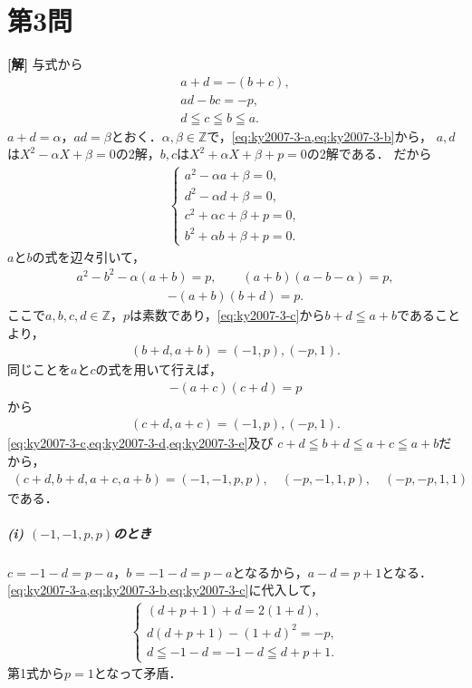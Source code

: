 \documentclass[../main.tex]{subfiles}
\begin{document}
\section*{第3問}

{\bf [解]}
与式から
\begin{align}
  a+d=-(b+c),\label{eq:ky2007-3-a}\\
  ad-bc=-p,\label{eq:ky2007-3-b}\\
  d\leqq c\leqq b\leqq a.\label{eq:ky2007-3-c}
\end{align}
$a+d=\alpha$，$ad=\beta$とおく．$\alpha,\beta\in\mathbb{Z}$で，\cref{eq:ky2007-3-a,eq:ky2007-3-b}から，
$a,d$は$X^2-\alpha X+\beta=0$の2解，$b,c$は$X^2+\alpha X+\beta+p=0$の2解である．
だから
\begin{align}
  \begin{cases}
    a^2-\alpha a+\beta=0,\\
    d^2-\alpha d+\beta=0,\\
    c^2+\alpha c+\beta+p=0,\\
    b^2+\alpha b+\beta+p=0.
  \end{cases}\label{eq:ky2007-3-roots}
\end{align}
$a$と$b$の式を辺々引いて，
\begin{align}
  a^2-b^2-\alpha(a+b)=p,\qquad(a+b)(a-b-\alpha)=p,
\end{align}
\begin{align}-(a+b)(b+d)=p.
\end{align}
ここで$a,b,c,d\in\mathbb{Z}$，$p$は素数であり，\cref{eq:ky2007-3-c}から$b+d\leqq a+b$であることより，
\begin{align}(b+d,a+b)=(-1,p),(-p,1).\label{eq:ky2007-3-d}
\end{align}
同じことを$a$と$c$の式を用いて行えば，
\begin{align}-(a+c)(c+d)=p
\end{align}
から
\begin{align}(c+d,a+c)=(-1,p),(-p,1).\label{eq:ky2007-3-e}
\end{align}
\cref{eq:ky2007-3-c,eq:ky2007-3-d,eq:ky2007-3-e}及び
$c+d\leqq b+d\leqq a+c\leqq a+b$だから，
\begin{align}
  (c+d,b+d,a+c,a+b)=(-1,-1,p,p),\quad(-p,-1,1,p),\quad(-p,-p,1,1)
\end{align}
である．

\subparagraph{(i) $(-1,-1,p,p)$のとき}
$c=-1-d=p-a$，$b=-1-d=p-a$となるから，$a-d=p+1$となる．
\cref{eq:ky2007-3-a,eq:ky2007-3-b,eq:ky2007-3-c}に代入して，
\begin{align}
  \begin{cases}
    (d+p+1)+d=2(1+d),\\
    d(d+p+1)-(1+d)^2=-p,\\
    d\leqq-1-d=-1-d\leqq d+p+1.
  \end{cases}
\end{align}
第1式から$p=1$となって矛盾．
\end{document}
